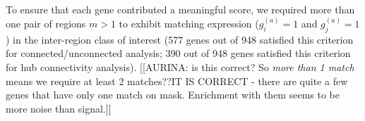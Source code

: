 \documentclass[10pt,letterpaper]{article}
\begin{document}

To ensure that each gene contributed a meaningful score, we required more than one pair of regions $m > 1$ to exhibit matching expression ($g^{(a)}_i = 1$ and $g^{(a)}_j = 1$) in the inter-region class of interest (577 genes out of 948 satisfied this criterion for connected/unconnected analysis; 390 out of 948 genes satisfied this criterion for hub connectivity analysis).
[[AURINA: is this correct? So \emph{more than 1 match} means we require at least 2 matches??IT IS CORRECT - there are quite a few genes that have only one match on mask. Enrichment with them seems to be more noise than signal.]]
\end{document}
